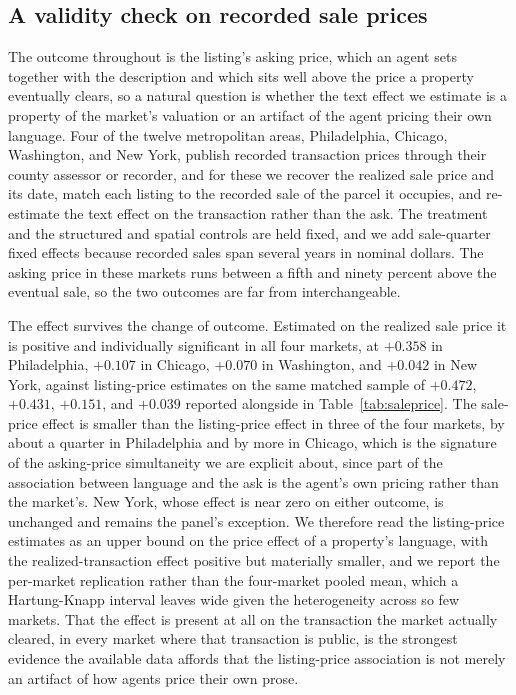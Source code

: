 \subsection{A validity check on recorded sale prices}
\label{sec:saleprice}

The outcome throughout is the listing's asking price, which an agent sets together
with the description and which sits well above the price a property eventually
clears, so a natural question is whether the text effect we estimate is a property
of the market's valuation or an artifact of the agent pricing their own language.
Four of the twelve metropolitan areas, Philadelphia, Chicago, Washington, and New
York, publish recorded transaction prices through their county assessor or
recorder, and for these we recover the realized sale price and its date, match
each listing to the recorded sale of the parcel it occupies, and re-estimate the
text effect on the transaction rather than the ask. The treatment and the
structured and spatial controls are held fixed, and we add sale-quarter fixed
effects because recorded sales span several years in nominal dollars. The asking
price in these markets runs between a fifth and ninety percent above the eventual
sale, so the two outcomes are far from interchangeable.

The effect survives the change of outcome. Estimated on the realized sale price it
is positive and individually significant in all four markets, at $+0.358$ in
Philadelphia, $+0.107$ in Chicago, $+0.070$ in Washington, and $+0.042$ in New
York, against listing-price estimates on the same matched sample of $+0.472$,
$+0.431$, $+0.151$, and $+0.039$ reported alongside in Table~\ref{tab:saleprice}.
The sale-price effect is smaller than the listing-price effect in three of the
four markets, by about a quarter in Philadelphia and by more in Chicago, which is
the signature of the asking-price simultaneity we are explicit about, since part
of the association between language and the ask is the agent's own pricing rather
than the market's. New York, whose effect is near zero on either outcome, is
unchanged and remains the panel's exception. We therefore read the listing-price
estimates as an upper bound on the price effect of a property's language, with the
realized-transaction effect positive but materially smaller, and we report the
per-market replication rather than the four-market pooled mean, which a
Hartung-Knapp interval leaves wide given the heterogeneity across so few markets.
That the effect is present at all on the transaction the market actually cleared,
in every market where that transaction is public, is the strongest evidence the
available data affords that the listing-price association is not merely an artifact
of how agents price their own prose.


